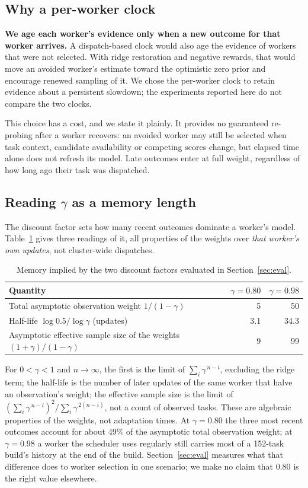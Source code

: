 \documentclass[final,5p,times,twocolumn]{elsarticle}
\begin{document}
\subsection{Why a per-worker clock}
\label{sec:clock}

\textbf{We age each worker's evidence only when a new outcome for that worker arrives.} A dispatch-based clock would also age the evidence of workers that were not selected. With ridge restoration and negative rewards, that would move an avoided worker's estimate toward the optimistic zero prior and encourage renewed sampling of it. We chose the per-worker clock to retain evidence about a persistent slowdown; the experiments reported here do not compare the two clocks.

This choice has a cost, and we state it plainly. It provides no guaranteed re-probing after a worker recovers: an avoided worker may still be selected when task context, candidate availability or competing scores change, but elapsed time alone does not refresh its model. Late outcomes enter at full weight, regardless of how long ago their task was dispatched.

\subsection{Reading $\gamma$ as a memory length}

The discount factor sets how many recent outcomes dominate a worker's model. Table~\ref{tab:memory} gives three readings of it, all properties of the weights over \emph{that worker's own updates}, not cluster-wide dispatches.

\begin{table}[t]
\centering
\caption{Memory implied by the two discount factors evaluated in Section~\ref{sec:eval}.}
\label{tab:memory}
\footnotesize
\begin{tabular}{@{}p{5.2cm}rr@{}}
\toprule
Quantity & $\gamma=0.80$ & $\gamma=0.98$ \\
\midrule
Total asymptotic observation weight $1/(1-\gamma)$ & 5 & 50 \\
Half-life $\log 0.5/\log\gamma$ (updates) & 3.1 & 34.3 \\
Asymptotic effective sample size of the weights $(1+\gamma)/(1-\gamma)$ & 9 & 99 \\
\bottomrule
\end{tabular}
\end{table}

For $0<\gamma<1$ and $n\to\infty$, the first is the limit of $\sum_i\gamma^{\,n-i}$, excluding the ridge term; the half-life is the number of later updates of the same worker that halve an observation's weight; the effective sample size is the limit of $(\sum_i\gamma^{\,n-i})^2/\sum_i\gamma^{\,2(n-i)}$, not a count of observed tasks. These are algebraic properties of the weights, not adaptation times. At $\gamma=0.80$ the three most recent outcomes account for about 49\% of the asymptotic total observation weight; at $\gamma=0.98$ a worker the scheduler uses regularly still carries most of a 152-task build's history at the end of the build. Section~\ref{sec:eval} measures what that difference does to worker selection in one scenario; we make no claim that 0.80 is the right value elsewhere.
\end{document}

